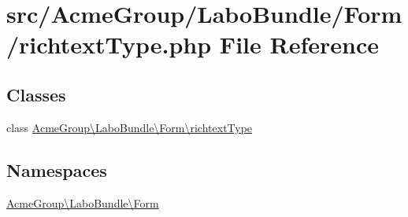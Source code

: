 \hypertarget{richtext_type_8php}{\section{src/\+Acme\+Group/\+Labo\+Bundle/\+Form/richtext\+Type.php File Reference}
\label{richtext_type_8php}
}
\subsection*{Classes}
\begin{DoxyCompactItemize}
\item 
class \hyperlink{class_acme_group_1_1_labo_bundle_1_1_form_1_1richtext_type}{Acme\+Group\textbackslash{}\+Labo\+Bundle\textbackslash{}\+Form\textbackslash{}richtext\+Type}
\end{DoxyCompactItemize}
\subsection*{Namespaces}
\begin{DoxyCompactItemize}
\item 
 \hyperlink{namespace_acme_group_1_1_labo_bundle_1_1_form}{Acme\+Group\textbackslash{}\+Labo\+Bundle\textbackslash{}\+Form}
\end{DoxyCompactItemize}
